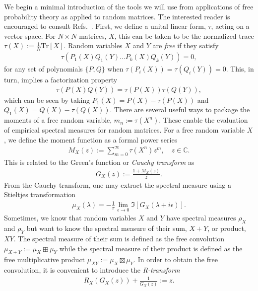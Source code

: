 \documentclass[a4paper,11pt]{article}
\newcommand{\Tr}{\text{Tr}}
\begin{document}
We begin a minimal introduction of the tools we will use from applications of free probability theory as applied to random matrices. The interested reader is encouraged to consult Refs.~\cite{nica_speicher_2006,MingoSpeicher_2017}. First, we define a unital linear form, $\tau$, acting on a vector space. For $N\times N$ matrices, $X$, this can be taken to be the normalized trace $\tau(X) := \frac{1}{N}\Tr\left[ X \right]$. Random variables $X$ and $Y$ are \textit{free} if they satisfy
\begin{align}
    \tau\left(P_1(X)Q_1(Y)\dots P_k(X)Q_k(Y)\right) = 0,
\end{align}
for any set of polynomials $\{P,Q\}$ when $\tau\left(P_i(X) \right)=\tau\left(Q_i(Y) \right) =0$. This, in turn, implies a factorization property
\begin{align}
    \tau\left( P(X)Q(Y)\right) = \tau\left( P(X)\right)\tau\left(Q(Y)\right),
    \label{free_factor}
\end{align}
which can be seen by taking $P_1(X) = P(X) -\tau(P(X))$ and $Q_1(X) = Q(X) -\tau(Q(X))$.
There are several useful ways to package the moments of a free random variable, $m_n := \tau(X^n)$. These enable the evaluation of empirical spectral measures for random matrices. For a free random variable $X$, we define the moment function as a formal power series
\begin{align}
    M_X(z) := \sum_{m = 0}^{\infty}\tau(X^n)z^m,\quad z \in \mathbb{C}.
\end{align}
This is related to the Green's function or \textit{Cauchy transform} as
\begin{align}
    G_X(z) := \frac{1+M_X(z)}{z}.
\end{align}
From the Cauchy transform, one may extract the spectral measure using a Stieltjes transformation
\begin{align}
    \mu_X(\lambda) = -\frac{1}{\pi}\lim_{\epsilon\rightarrow 0}\Im\left[G_X(\lambda + i\epsilon) \right].
\end{align}
Sometimes, we know that random variables $X$ and $Y$ have spectral measures $\rho_X$ and $\rho_Y$ but want to know the spectral measure of their sum, $X+Y$, or product, $XY$. The spectral measure of their sum is defined as the free convolution $\mu_{X+Y} := \mu_X \boxplus \mu_Y$ while the spectral measure of their product is defined as the free multiplicative product $\mu_{XY} := \mu_X \boxtimes \mu_Y$. In order to obtain the free convolution, it is convenient to introduce the \textit{R-transform}
\begin{align}
    R_X(G_X(z)) + \frac{1}{G_X(z)} :=  z.
\end{align}
\end{document}
